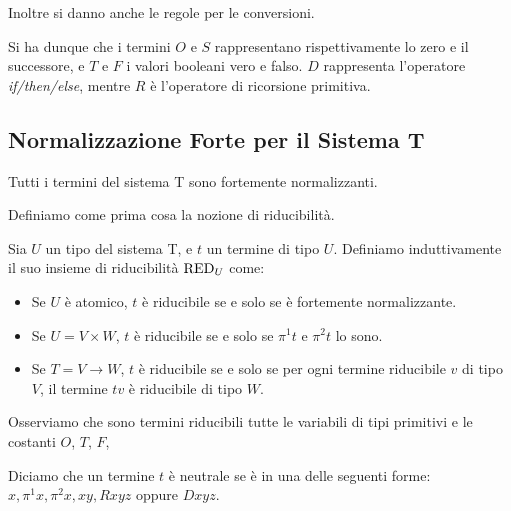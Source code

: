 \documentclass[]{marticle}
\begin{document}
\begin{block}[Definizione]
\end{block}

Inoltre si danno anche le regole per le conversioni.

\begin{block}[Definizione]
\end{block}

Si ha dunque che i termini $O$ e $S$ rappresentano rispettivamente lo zero e il
successore, e $T$ e $F$ i valori booleani vero e falso. $D$ rappresenta
l'operatore \textit{if/then/else}, mentre $R$ \`e l'operatore di ricorsione
primitiva.

\subsection{Normalizzazione Forte per il Sistema T}
\begin{block}[Teorema]
    Tutti i termini del sistema T sono fortemente normalizzanti.
\end{block}

Definiamo come prima cosa la nozione di riducibilit\`a. 

\begin{block}[Definizione]
    Sia $U$ un tipo del sistema T, e $t$ un termine di tipo $U$. Definiamo
    induttivamente il suo insieme di riducibilit\`a $\text{RED}_{U}$ come:
    \begin{itemize}
        \item Se $U$ \`e atomico, $t$ \`e riducibile se e solo se \`e fortemente
            normalizzante.
        \item Se $U=V\times W$, $t$ \`e riducibile se e solo se $\pi^1 t$ e $\pi
            ^2 t$ lo sono. 
        \item Se $T = V \rightarrow W$, $t$ \`e riducibile se e solo se per ogni
            termine riducibile $v$ di tipo $V$, il termine $tv$ \`e riducibile
            di tipo $W$.
    \end{itemize}
\end{block}

Osserviamo che sono termini riducibili tutte le variabili di tipi primitivi e le
costanti $O$, $T$, $F$,

\begin{block}[Definizione]
    Diciamo che un termine $t$ \`e neutrale se \`e in una delle seguenti forme:
    $x, \pi^1 x, \pi^2 x, xy, Rxyz$ oppure $Dxyz$.
\end{block}
\end{document}
